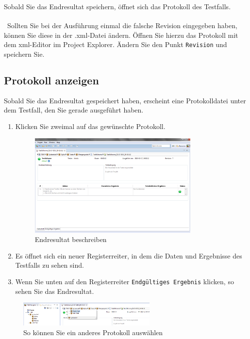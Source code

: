 \documentclass[11pt,a4paper,titlepage]{article}
\begin{document}
Sobald Sie das Endresultat speichern, öffnet sich das Protokoll des Testfalls.\\
\\\
Sollten Sie bei der Ausführung einmal die falsche Revision eingegeben haben, können Sie diese in der .xml-Datei ändern.
Öffnen Sie hierzu das Protokoll mit dem xml-Editor im Project Explorer. Ändern Sie den Punkt \texttt{Revision} und speichern Sie.

\subsection{Protokoll anzeigen}
Sobald Sie das Endresultat gespeichert haben, erscheint eine Protokolldatei unter dem Testfall, den Sie gerade ausgeführt haben.
\begin{enumerate}
\item Klicken Sie zweimal auf das gewünschte Protokoll.

\begin{figure}[H]
\centering
\includegraphics[width= 320px]{BilderHandbuch/Protokoll/Protokoll.png}
\caption{Endresultat beschreiben}
\label{fig:Protokoll}
\end{figure}

\item Es öffnet sich ein neuer Registerreiter, in dem die Daten und Ergebnisse des Testfalls zu sehen sind.
\item Wenn Sie unten auf den Registerreiter \texttt{Endgültiges Ergebnis} klicken, so sehen Sie das Endresultat.
\end{enumerate}


\begin{figure}[H]
\centering
\includegraphics[width= 260px]{BilderHandbuch/Protokoll/Breadcrumb.png}
\caption{So können Sie ein anderes Protokoll auswählen}
\label{fig:Breadcrumb}
\end{figure}
\end{document}
